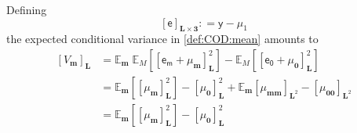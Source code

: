\documentclass[preprint,12pt]{elsarticle}
\newcommand*{\M}[1]{\ensuremath{#1}\xspace}
\newcommand*{\x}{\times}
\newcommand*{\mi}[1]{\mathbf{#1}}
\newcommand*{\rv}[1]{\mathsf{#1}}
\newcommand*{\te}[2][]{\left\lbrack{#2}\right\rbrack_{#1}}
\newcommand*{\deq}{\M{\mathrel{\mathop:}=}}
\newcommand*{\ev}[3][]{\mathbb{E}_{#3}^{#1}\!\left\lbrack{#2}\right\rbrack}
\newcommand*{\evt}[3][]{\mathbb{E}_{#3}^{#1}\!#2}
\begin{document}
    Defining
    \begin{equation}\label{def:SPEst:e}
        \te[\mi{L\x 3}]{\rv{e}} \deq \rv{y} - \mu_{1}
    \end{equation}
    the expected conditional variance in \cref{def:COD:mean} amounts to
    \begin{equation}\label{eq:SPEst:V}
        \begin{aligned}
            \te[\mi{L}]{V_{\mi{m}}} 
            &= \evt{\;\ev{\te[\mi{L}]{\rv{e_m} + \mu_{\mi{m}}}^{2}}{M}}{\mi{m}}
            - \ev{\te[\mi{L}]{\rv{e_0} + \mu_{\mi{0}}}^{2}}{M} \\
            &= \ev{\te[\mi{L}]{\mu_{\mi{m}}}^{2}}{\mi{m}} - \te[\mi{L}]{\mu_{\mi{0}}}^{2} + 
            \evt{\te[\mi{L}^2]{\mu_{\mi{mm}}}}{\mi{m}} - \te[\mi{L}^2]{\mu_{\mi{00}}} \\
            &= \ev{\te[\mi{L}]{\mu_{\mi{m}}}^{2}}{\mi{m}} - \te[\mi{L}]{\mu_{\mi{0}}}^{2}
        \end{aligned}
    \end{equation}
\end{document}

